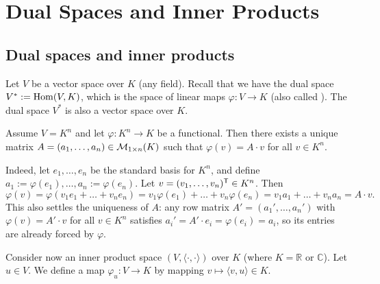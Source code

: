 \renewcommand{\thetheorem}{23.a.\arabic{theorem}}
\setcounter{theorem}{0}
\setcounter{chapter}{22}

\chapter{Dual Spaces and Inner Products}

\section{Dual spaces and inner products}

Let $V$ be a vector space over $K$ (any field). Recall that we have the dual space $V^* := \operatorname{Hom}(V, K)$, which is the space of linear maps $\varphi \colon V \to K$ (also called ). The dual space $V^*$ is also a vector space over $K$.

\begin{warmup}
Assume $V = K^n$ and let $\varphi \colon K^n \to K$ be a functional. Then there exists a unique matrix $A = (a_1, \dots, a_n) \in \mathcal{M}_{1 \times n}(K)$ such that $\varphi(v) = A \cdot v$ for all $v \in K^n$.

Indeed, let $e_1, \dots, e_n$ be the standard basis for $K^n$, and define $a_1 := \varphi(e_1), \dots, a_n := \varphi(e_n)$. Let $v = (v_1, \dots, v_n)^{\mathsf{T}} \in K^n$. Then
\[
    \varphi(v) = \varphi(v_1 e_1 + \dots + v_n e_n) = v_1 \varphi(e_1) + \dots + v_n \varphi(e_n) = v_1 a_1 + \dots + v_n a_n = A \cdot v.
\]
This also settles the uniqueness of $A$: any row matrix $A' = (a_1', \dots, a_n')$ with $\varphi(v) = A' \cdot v$ for all $v \in K^n$ satisfies $a_i' = A' \cdot e_i = \varphi(e_i) = a_i$, so its entries are already forced by $\varphi$.
\end{warmup}

Consider now an inner product space $(V, \langle \cdot, \cdot \rangle)$ over $K$ (where $K = \mathbb{R}$ or $\mathbb{C}$). Let $u \in V$. We define a map $\varphi_u \colon V \to K$ by mapping $v \mapsto \langle v, u \rangle \in K$.

